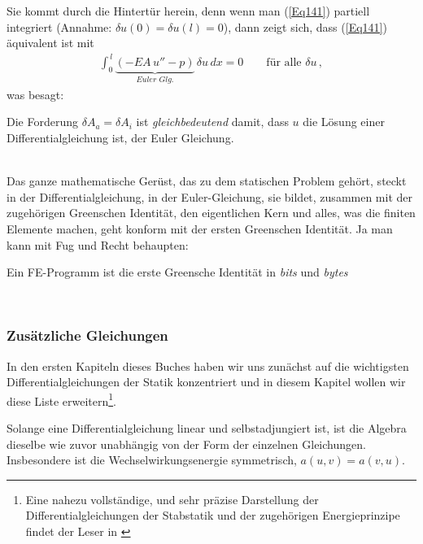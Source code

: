 Sie kommt durch die Hintert\"{u}r herein, denn wenn man (\ref{Eq141}) partiell integriert (Annahme: $\delta u(0) = \delta u(l) = 0$), dann zeigt sich, dass (\ref{Eq141})  \"{a}quivalent ist mit
\begin{align}
\int_0^{\,l} \underbrace{(- EA\,u'' - p)}_{Euler\,\, Glg.}\,\delta u\,dx = 0 \qquad \text{f\"{u}r alle $\delta u$}\,,
\end{align}
was besagt:\\

\hspace*{-12pt}\colorbox{highlightBlue}{\parbox{0.98\textwidth}{Die Forderung $\delta A_a = \delta A_i $ ist {\em gleichbedeutend\/} damit, dass $u$ die L\"{o}sung einer Differentialgleichung ist, der Euler Gleichung.}}\\

Das ganze mathematische Ger\"{u}st, das zu dem statischen Problem geh\"{o}rt, steckt in der Differentialgleichung, in der Euler-Gleichung, sie bildet, zusammen mit der zugeh\"{o}rigen Greenschen Identit\"{a}t, den eigentlichen Kern und alles, was die finiten Elemente machen, geht konform mit der ersten Greenschen Identit\"{a}t. Ja man kann mit Fug und Recht behaupten:\\

\hspace*{-12pt}\colorbox{highlightBlue}{\parbox{0.98\textwidth}{Ein FE-Programm ist die erste Greensche Identit\"{a}t in {\em bits\/} und {\em bytes\/}}}\\

{\textcolor{sectionTitleBlue}{\subsubsection*{Zus\"{a}tzliche Gleichungen}}}
In den ersten Kapiteln dieses Buches haben wir uns zun\"{a}chst auf die wichtigsten Differentialgleichungen der Statik konzentriert und in diesem Kapitel wollen wir diese Liste erweitern\footnote{Eine nahezu vollst\"{a}ndige, und sehr pr\"{a}zise Darstellung der Differentialgleichungen der Stabstatik und der zugeh\"{o}rigen Energieprinzipe findet der Leser in \cite{Ramm}}.

Solange eine Differentialgleichung linear und selbstadjungiert ist, ist die Algebra dieselbe wie zuvor unabh\"{a}ngig von der Form der einzelnen Gleichungen. Insbesondere ist die Wechselwirkungsenergie symmetrisch, $a(u, v) = a(v, u)$.

